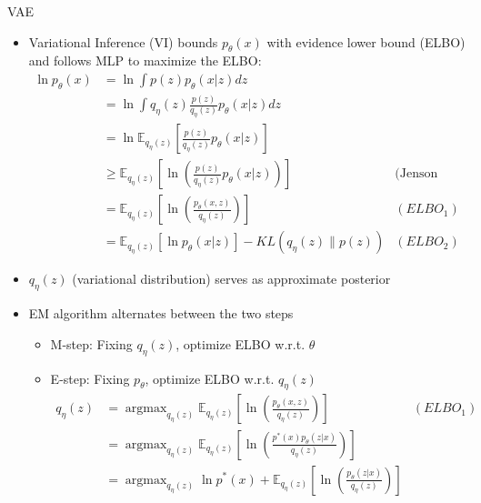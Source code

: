 \documentclass[compress]{beamer}
\newcommand{\expects}[2]{\mathbb{E}_{#1} \left[ #2 \right]}
\begin{document}
\begin{frame}[allowframebreaks]{VAE}
    \begin{itemize}
        \item Variational Inference (VI) bounds $p_{\theta}(x)$ with evidence lower bound (ELBO) and follows MLP to maximize the ELBO:
            \begin{align*}
                \ln p_{\theta}(x) & = \ln \int p(z)p_{\theta}(x|z) dz & \\
                                  & =  \ln \int q_{\eta}(z) \frac{p(z)}{q_{\eta}(z)} p_{\theta}(x|z) dz & \\
                                  & =  \ln \expects{q_{\eta}(z)}{ \frac{p(z)}{q_{\eta}(z)} p_{\theta}(x|z)}&  \\
                                  & \ge \expects{q_{\eta}(z)}{ \ln \left(  \frac{p(z)}{q_{\eta}(z)} p_{\theta}(x|z)\right) } & \text{(Jenson Inequality)}\\
                                  & = \expects{q_{\eta}(z)}{ \ln \left(  \frac{p_{\theta}(x,z)}{q_{\eta}(z)} \right) } & (ELBO_1)\\
                                  & = \expects{q_{\eta}(z)}{\ln p_{\theta}(x|z)} - KL(q_{\eta}(z)\|p(z)) & (ELBO_2)
            \end{align*}
    \end{itemize}
    \framebreak
    \begin{itemize}
        \item $q_{\eta}(z)$ (variational distribution) serves as approximate posterior
        \item EM algorithm alternates between the two steps
            \begin{itemize}
                \item M-step: Fixing $q_{\eta}(z)$, optimize ELBO w.r.t. $\theta$ \\
                \item E-step: Fixing $p_{\theta}$, optimize ELBO w.r.t. $q_{\eta}(z)$
                    \begin{align*}
                        q_{\eta}(z) &  = \mathop{argmax}_{q_\eta(z)}\expects{q_{\eta}(z)}{ \ln \left(  \frac{p_{\theta}(x,z)}{q_{\eta}(z)} \right) } & (ELBO_1)\\
                                    &  = \mathop{argmax}_{q_\eta(z)}\expects{q_{\eta}(z)}{ \ln \left(  \frac{p^*(x)p_{\theta}(z|x)}{q_{\eta}(z)} \right) } & \\
                                    &  = \mathop{argmax}_{q_\eta(z)} \ln p^*(x) + \expects{q_{\eta}(z)}{ \ln \left(  \frac{p_{\theta}(z|x)}{q_{\eta}(z)} \right) } & \\

\end{align*}
\end{itemize}
\end{itemize}
\end{frame}
\end{document}

